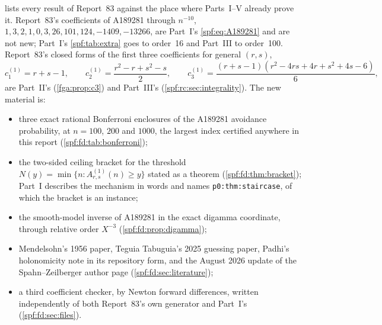 \documentclass[11pt]{article}
\numberwithin{equation}{section}
\theoremstyle{definition}
\theoremstyle{remark}
\theoremstyle{definition}
\begin{document}
 lists every result of Report~83 against the place
where Parts~I--V already prove it. Report~83's coefficients of A189281
through $n^{-10}$, $1,3,2,1,0,3,26,101,124,-1409,-13266$, are Part~I's
\eqref{spf:eq:A189281} and are not new; Part~I's \cref{spf:tab:extra} goes to
order~16 and Part~III to order~100. Report~83's closed forms of the first
three coefficients for general $(r,s)$,
\[
 c_1^{(1)}=r+s-1,\qquad c_2^{(1)}=\frac{r^2-r+s^2-s}{2},\qquad
 c_3^{(1)}=\frac{(r+s-1)(r^2-4rs+4r+s^2+4s-6)}{6},
\]
are Part~II's (\cref{fga:prop:c3}) and Part~III's
(\cref{spf:rc:sec:integrality}). The new material is:
\begin{itemize}
\item three exact rational Bonferroni enclosures of the A189281 avoidance
 probability, at $n=100$, $200$ and $1000$, the largest index certified
 anywhere in this report (\cref{spf:fd:tab:bonferroni});
\item the two-sided ceiling bracket for the threshold
 $N(y)=\min\{n:A^{(1)}_{r,s}(n)\ge y\}$ stated as a theorem
 (\cref{spf:fd:thm:bracket}); Part~I describes the mechanism in words and
 names \texttt{p0:thm:staircase}, of which the bracket is an instance;
\item the smooth-model inverse of A189281 in the exact digamma coordinate,
 through relative order $X^{-3}$ (\cref{spf:fd:prop:digamma});
\item Mendelsohn's 1956 paper, Teguia Tabuguia's 2025 guessing paper, Padhi's
 holonomicity note in its repository form, and the August 2026 update of
 the Spahn--Zeilberger author page (\cref{spf:fd:sec:literature});
\item a third coefficient checker, by Newton forward differences, written
 independently of both Report~83's own generator and Part~I's
 (\cref{spf:fd:sec:files}).
\end{itemize}
\end{document}
